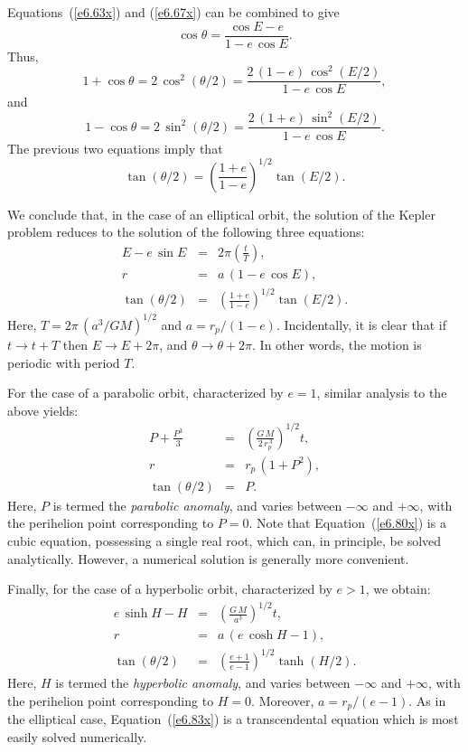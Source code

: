 Equations~(\ref{e6.63x}) and (\ref{e6.67x}) can be combined
to give
\begin{equation}
\cos\theta = \frac{\cos E - e}{1-e\,\cos E}.
\end{equation}
Thus,
\begin{equation}
1+\cos\theta = 2\,\cos^2(\theta/2) = \frac{2\,(1-e)\,\cos^2( E/2)}{1-e\,\cos E},
\end{equation}
and
\begin{equation}
1-\cos\theta = 2\,\sin^2(\theta/2) = \frac{2\,(1+e)\,\sin^2 (E/2)}{1-e\,\cos E}.
\end{equation}
The previous two equations imply that
\begin{equation}
\tan (\theta/2) = \left(\frac{1+e}{1-e}\right)^{1/2}\tan (E/2).
\end{equation}

We conclude that, in the case of an elliptical orbit, the solution of the Kepler problem reduces to the solution of the following three equations:
\begin{eqnarray}
E - e\,\sin E &=& 2\pi\left(\frac{t}{T}\right),\\[0.5ex]
r &=&a\,(1-e\,\cos E),\\[0.5ex]
\tan(\theta/2) &=&\left(\frac{1+e}{1-e}\right)^{1/2} \tan (E/2).
\end{eqnarray}
Here, $T=2\pi\,(a^3/GM)^{1/2}$ and $a=r_p/(1-e)$. Incidentally, it is clear that if $t\rightarrow t+T$ then $E\rightarrow E + 2\pi$, and $\theta\rightarrow
\theta+2\pi$. In other words, the motion is periodic with period
$T$. 

For the case of a parabolic orbit, characterized by $e=1$, similar analysis to
the above yields:
\begin{eqnarray}
P + \frac{P^3}{3} &=& \left(\frac{G\,M}{2\,r_p^{\,3}}\right)^{1/2} t,\label{e6.80x}\\[0.5ex]
r &=& r_p\,(1+P^2),\\[0.5ex]
\tan(\theta/2) &=& P.\label{e6.82x}
\end{eqnarray}
Here, $P$ is termed the {\em parabolic anomaly}, and varies between
$-\infty$ and $+\infty$, with the perihelion point corresponding to $P=0$. Note that Equation~(\ref{e6.80x}) is a cubic equation,
possessing a single real root,
which can, in principle, be solved analytically. However, a numerical
solution is generally more convenient.

Finally, for the case of a hyperbolic orbit, characterized by $e>1$,
we obtain:
\begin{eqnarray}
e\,\sinh H - H &=& \left(\frac{G\,M}{a^3}\right)^{1/2} t,\label{e6.83x}\\[0.5ex]
r &=& a\,(e\,\cosh H - 1),\\[0.5ex]
\tan(\theta/2) &=& \left(\frac{e+1}{e-1}\right)^{1/2} \tanh (H/2).\label{e6.85x}
\end{eqnarray}
Here, $H$ is termed the {\em hyperbolic anomaly}, and varies between
$-\infty$ and $+\infty$, with the perihelion point corresponding to $H=0$.  Moreover, $a=r_p/(e-1)$. As in the elliptical
case, Equation~(\ref{e6.83x}) is a transcendental equation which is most easily solved numerically.

